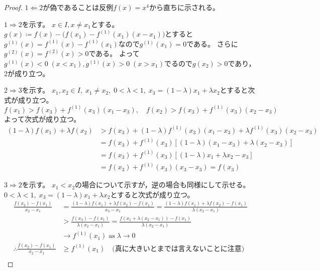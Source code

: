             \begin{proof}
                \quad\par
                $1\Leftarrow 2$が偽であることは反例$f(x) = x^4$から直ちに示される。
                \par
                $1\Rightarrow 2$を示す。
                $x\in I,x\neq x_1$とする。
                $g(x) \coloneq f(x) - \bigl(f(x_1) - f^{(1)}(x_1)(x-x_1)\bigr)$とすると$g^{(1)}(x) = f^{(1)}(x) - f^{(1)}(x_1)$なので$g^{(1)}(x_1) = 0$である。
                さらに$g^{(2)}(x) = f^{(2)}(x) > 0$である。
                よって$g^{(1)}(x) < 0\;(x<x_1), g^{(1)}(x) > 0\;(x>x_1)$でるので$g(x_2) > 0$であり，2が成り立つ。
                \par
                $2\Rightarrow 3$を示す。
                $x_1,x_2\in I,\;x_1\neq x_2,\;0<\lambda<1,\;x_3 = (1-\lambda)x_1 + \lambda x_2$とすると次式が成り立つ。
                \[ f(x_1) > f(x_3) + f^{(1)}(x_3)(x_1-x_3),\quad f(x_2) > f(x_3) + f^{(1)}(x_3)(x_2-x_3) \]
                よって次式が成り立つ。
                \begin{align*}
                    (1-\lambda)f(x_1) + \lambda f(x_2) &> f(x_3) + (1-\lambda)f^{(1)}(x_3)(x_1-x_3) + \lambda f^{(1)}(x_3)(x_2-x_3) \\
                    &= f(x_3) + f^{(1)}(x_3)\left[(1-\lambda)(x_1-x_3) + \lambda(x_2-x_3)\right] \\
                    &= f(x_3) + f^{(1)}(x_3)\left[(1-\lambda)x_1 + \lambda x_2 - x_3\right] \\
                    &= f(x_3) + f^{(1)}(x_3)(x_3-x_3) = f(x_3)
                \end{align*}
                \par
                $3\Rightarrow 2$を示す。
                $x_1<x_2$の場合について示すが，逆の場合も同様にして示せる。
                $0<\lambda<1,\;x_3 = (1-\lambda)x_1 + \lambda x_2$とすると次式が成り立つ。
                \begin{align*}
                    \frac{f(x_2)-f(x_1)}{x_2-x_1} &= \frac{(1-\lambda)f(x_1) + \lambda f(x_2) - f(x_1)}{x_3-x_1} = \frac{(1-\lambda)f(x_1) + \lambda f(x_2) - f(x_1)}{\lambda(x_2-x_1)} \\
                    &> \frac{f(x_3) - f(x_1)}{\lambda(x_2-x_1)} = \frac{f(x_1 + \lambda(x_2-x_1)) - f(x_1)}{\lambda(x_2-x_1)} \tag{1} \\
                    &\to f^{(1)}(x_1)\; \text{as}\; \lambda\to 0 \\
                    \therefore \frac{f(x_2)-f(x_1)}{x_2-x_1} &\geq f^{(1)}(x_1) \quad \text{(真に大きいとまでは言えないことに注意)} \\

\end{align*}
\end{proof}
